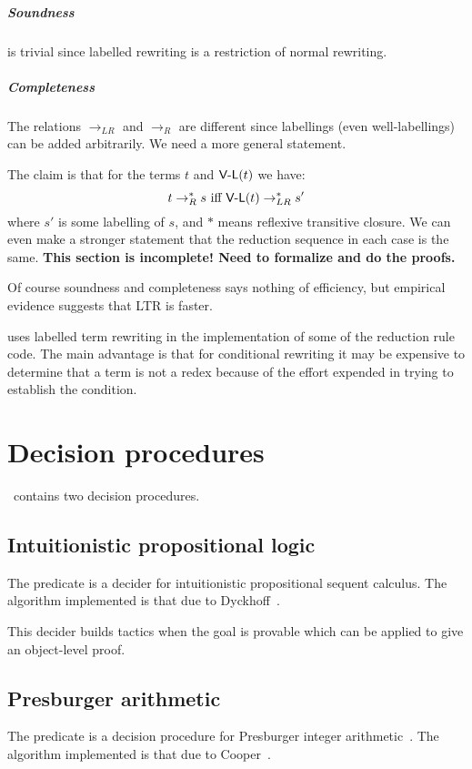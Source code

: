 \paragraph {Soundness} is trivial since labelled rewriting is a
restriction of normal rewriting.

\paragraph {Completeness} The relations $\rightarrow_{LR}$ and
$\rightarrow_R$ are different since labellings (even well-labellings)
can be added arbitrarily.  We need a more general statement.

The claim is that for the terms $t$ and $\mbox{\sf V-L}(t)$ we have:
\[
	t\rightarrow_R^* s\mbox{ iff }
		\mbox{\sf V-L}(t)\rightarrow_{LR}^* s'
\]
where $s'$ is some labelling of $s$, and $*$ means reflexive
transitive closure.  We can even make a stronger statement that the
reduction sequence in each case is the same.   {\bf This section is
incomplete! Need to formalize  and do the proofs.}

Of course soundness and completeness says nothing of efficiency, but
empirical evidence suggests that LTR is faster.



\clam uses labelled term rewriting in the implementation of some of
the reduction rule code.  The main advantage is that for conditional
rewriting it may be expensive to determine that a term is not a redex
because of the effort expended in trying to establish the condition.



\chapter {Decision procedures}
\clam\ contains two decision procedures.  

\section {Intuitionistic propositional logic}

The predicate  is a decider for intuitionistic
propositional sequent calculus.  The algorithm implemented is that due
to Dyckhoff~\cite{Dyckhoff92}.  

This decider builds tactics when the goal is provable which can be
applied to give an object-level proof.

\section {Presburger arithmetic}
\label{presburger}
The predicate  is a decision procedure for Presburger
integer arithmetic~\cite{Presburger30}.   The algorithm  implemented is that due to
Cooper~\cite{Cooper72}.   

